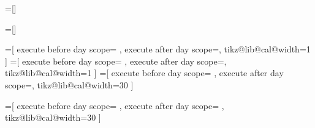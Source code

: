 =[]

=[]

\def\tikzdaycode{\node[name=\pgfcalendarsuggestedname,every day]{\tikzdaytext};}
\def\tikzmonthcode{\node[every month]{\tikzmonthtext};}
\def\tikzyearcode{\node[every year]{\tikzyeartext};}

\def\tikzdaytext{\%d-}
\def\tikzmonthtext{\%mt}
\def\tikzyeartext{\%y0}




\def\tikz@lib@cal@width{1}

%
%

=[%
  execute before day scope={
  },  
  execute after day scope={\pgfmathsetlength{\pgf@y}{\tikz@lib@cal@yshift}\pgftransformyshift{-\pgf@y}},
  tikz@lib@cal@width=1
]
=[%
  execute before day scope={
  },  
  execute after day scope={\pgftransformyshift\tikz@lib@cal@yshift},
  tikz@lib@cal@width=1
]
=[%
  execute before day scope={
  },  
  execute after day scope={\pgftransformxshift\tikz@lib@cal@xshift},
  tikz@lib@cal@width=30%
]

=[%
  execute before day scope={
  },  
  execute after day scope={
    \pgfmathsetlength{\pgf@x}{\tikz@lib@cal@xshift}
    \pgftransformxshift{-\pgf@x}%
  },
  tikz@lib@cal@width=30%
]



